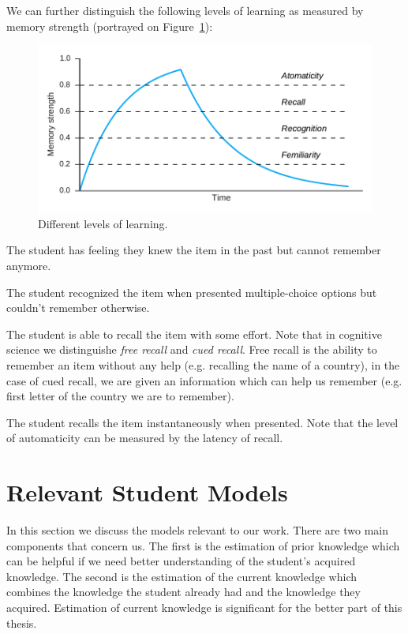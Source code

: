We can further distinguish the following levels of learning as measured by memory strength (portrayed on Figure~\ref{fig:knowledge-levels}):

\begin{figure}[htbp]
  \centering
  \includegraphics[width=\textwidth]{img/knowledge-levels}
  \caption{Different levels of learning.}
  \label{fig:knowledge-levels}
\end{figure}

\begin{description}[leftmargin=0cm]
  \item[Familiarity] The student has feeling they knew the item in the past but cannot remember anymore.
  \item[Recognition] The student recognized the item when presented multiple-choice options but couldn't remember otherwise.
  \item[Recall] The student is able to recall the item with some effort. Note that in cognitive science we distinguishe \textit{free recall} and \textit{cued recall}. Free recall is the ability to remember an item without any help (e.g. recalling the name of a country), in the case of cued recall, we are given an information which can help us remember (e.g. first letter of the country we are to remember).
  \item[Automaticity] The student recalls the item instantaneously when presented. Note that the level of automaticity can be measured by the latency of recall.
\end{description}

\section{Relevant Student Models}
\label{relevant-models}

In this section we discuss the models relevant to our work. There are two main components that concern us. The first is the estimation of prior knowledge which can be helpful if we need better understanding of the student's acquired knowledge. The second is the estimation of the current knowledge which combines the knowledge the student already had and the knowledge they acquired. Estimation of current knowledge is significant for the better part of this thesis.

